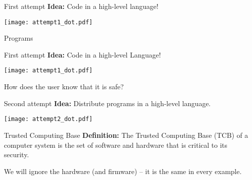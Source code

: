 \begin{frame}[fragile]{First attempt}
  \textbf{Idea:} Code in a high-level language!

  \pause\texttt{[image: attempt1\_dot.pdf]}
\end{frame}

\begin{frame}{Programs}{}
\end{frame}

\begin{frame}[fragile]{First attempt}
  \textbf{Idea:} Code in a high-level Language!

  \texttt{[image: attempt1\_dot.pdf]}

  \pause How does the user know that it is safe?
\end{frame}

\begin{frame}[fragile]{Second attempt}
  \textbf{Idea:} Distribute programs in a high-level language.

  \pause \texttt{[image: attempt2\_dot.pdf]}
\end{frame}

\begin{frame}{Trusted Computing Base}
  \textbf{Definition:} The Trusted Computing Base (TCB) of a computer system is
  the set of software and hardware that is critical to its security.

  \pause We will ignore the hardware (and firmware) -- it is the same in every
  example.
\end{frame}

